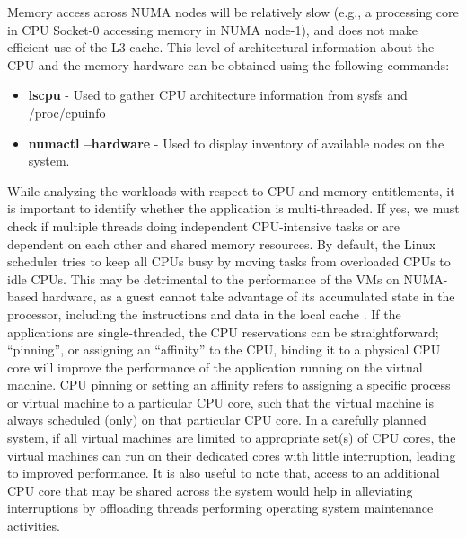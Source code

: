 Memory access across NUMA nodes will be relatively slow (e.g., a processing core in CPU Socket-0 accessing memory in NUMA node-1), and does not make efficient use of the L3 cache. This level of architectural information about the CPU and the memory hardware can be obtained using the following commands: \\
\begin{itemize}
\item \textbf{lscpu} \cite{lscpu} - Used to gather CPU architecture information from sysfs and /proc/cpuinfo
\item \textbf{numactl --hardware }\cite{numactl} - Used to display inventory of available nodes on the system. 
\end{itemize}


While analyzing the workloads with respect to CPU and memory entitlements, it is important to identify whether the application is multi-threaded. If yes, we must check if multiple threads doing independent CPU-intensive tasks or are dependent on each other and shared memory resources. By default, the Linux scheduler tries to keep all CPUs busy by moving tasks from overloaded CPUs to idle CPUs. This may be detrimental to the performance of the VMs on NUMA-based hardware, as a guest cannot take advantage of its accumulated state in the processor, including the instructions and data in the local cache \cite{procaffinity}. If the applications are single-threaded, the CPU reservations can be straightforward; ``pinning'', or assigning an ``affinity'' to the CPU, binding it to a physical CPU core will improve the performance of the application running on the virtual machine. CPU pinning or setting an affinity refers to assigning a specific process or virtual machine to a particular CPU core, such that the virtual machine is always scheduled (only) on that particular CPU core. In a carefully planned system, if all virtual machines are limited to appropriate set(s) of CPU cores, the virtual machines can run on their dedicated cores with little interruption, leading to improved performance. It is also useful to note that, access to an additional CPU core that may be shared across the system would help in alleviating interruptions by offloading threads performing operating system maintenance activities.

